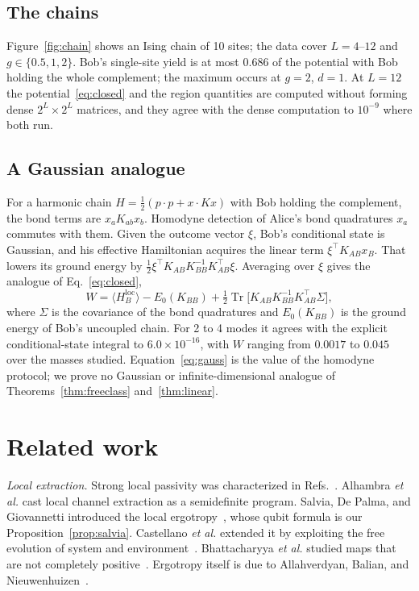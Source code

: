 \documentclass[aps,pra,twocolumn,reprint,superscriptaddress,nofootinbib,floatfix]{revtex4-2}
\theoremstyle{plain}
\theoremstyle{remark}
\newcommand{\Tr}{\operatorname{Tr}}
\newcommand{\HBl}{H_B^{\mathrm{loc}}}
\begin{document}
\subsection{The chains}

Figure~\ref{fig:chain} shows an Ising chain of 10 sites; the data cover
$L=4$--$12$ and $g\in\{0.5,1,2\}$. Bob's single-site yield is at most $0.686$ of the
potential with Bob holding the whole complement; the maximum occurs at $g=2$, $d=1$. At
$L=12$ the potential~\eqref{eq:closed} and the region quantities are computed without forming
dense $2^L\times2^L$ matrices, and they agree with the dense computation to $10^{-9}$ where
both run.

\subsection{A Gaussian analogue}
\label{sec:gaussian}

For a harmonic chain $H=\tfrac12(p\cdot p+x\cdot Kx)$ with Bob holding the complement, the
bond terms are $x_aK_{ab}x_b$. Homodyne detection of Alice's bond quadratures $x_a$
commutes with them. Given the outcome vector $\xi$, Bob's conditional state is Gaussian, and
his effective Hamiltonian acquires the linear term $\xi^{\top}K_{AB}x_B$. That lowers its
ground energy by $\tfrac12\xi^{\top}K_{AB}K_{BB}^{-1}K_{AB}^{\top}\xi$. Averaging over $\xi$
gives the analogue of Eq.~\eqref{eq:closed},
\begin{equation}
W=\langle\HBl\rangle-E_0(K_{BB})+\tfrac12\Tr\big[K_{AB}K_{BB}^{-1}K_{AB}^{\top}\Sigma\big],
\label{eq:gauss}
\end{equation}
where $\Sigma$ is the covariance of the bond quadratures and $E_0(K_{BB})$ is the ground
energy of Bob's uncoupled chain. For 2 to 4 modes it agrees with the explicit
conditional-state integral to $6.0\times10^{-16}$, with $W$ ranging from $0.0017$ to $0.045$
over the masses studied. Equation~\eqref{eq:gauss} is the value of the homodyne protocol; we
prove no Gaussian or infinite-dimensional analogue of Theorems~\ref{thm:freeclass}
and~\ref{thm:linear}.

\section{Related work}
\label{sec:related}

\emph{Local extraction.} Strong local passivity was characterized in
Refs.~\cite{Frey2014,Alhambra2019}. Alhambra \emph{et al.} cast local channel extraction as a
semidefinite program. Salvia, De Palma, and Giovannetti introduced the local
ergotropy~\cite{Salvia2023}, whose qubit formula is our Proposition~\ref{prop:salvia}.
Castellano \emph{et al.} extended it by exploiting the free evolution of system and
environment~\cite{Castellano2024}. Bhattacharyya \emph{et al.} studied maps that are not
completely positive~\cite{Bhattacharyya2024}. Ergotropy itself is due to Allahverdyan,
Balian, and Nieuwenhuizen~\cite{Allahverdyan2004}.
\end{document}
